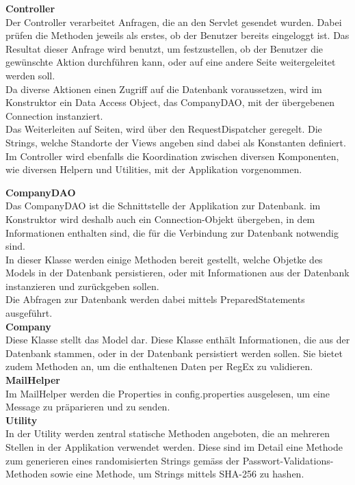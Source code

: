\documentclass[12pt]{scrartcl}
\begin{document}
\textbf{Controller}\\
Der Controller verarbeitet Anfragen, die an den Servlet gesendet wurden. Dabei prüfen die Methoden jeweils als erstes, ob der Benutzer bereits eingeloggt ist. Das Resultat dieser Anfrage wird benutzt, um festzustellen, ob der Benutzer die gewünschte Aktion durchführen kann, oder auf eine andere Seite weitergeleitet werden soll.\\
Da diverse Aktionen einen Zugriff auf die Datenbank voraussetzen, wird im Konstruktor ein Data Access Object, das CompanyDAO, mit der übergebenen Connection instanziert.\\
Das Weiterleiten auf Seiten, wird über den RequestDispatcher geregelt. Die Strings, welche Standorte der Views angeben sind dabei als Konstanten definiert.\\
Im Controller wird ebenfalls die Koordination zwischen diversen Komponenten, wie diversen Helpern und Utilities, mit der Applikation vorgenommen.

\textbf{CompanyDAO}\\
Das CompanyDAO ist die Schnittstelle der Applikation zur Datenbank. im Konstruktor wird deshalb auch ein Connection-Objekt übergeben, in dem Informationen enthalten sind, die für die Verbindung zur Datenbank notwendig sind.\\
In dieser Klasse werden einige Methoden bereit gestellt, welche Objetke des Models in der Datenbank persistieren, oder mit Informationen aus der Datenbank instanzieren und zurückgeben sollen.\\
Die Abfragen zur Datenbank werden dabei mittels PreparedStatements ausgeführt.\\

\textbf{Company}\\
Diese Klasse stellt das Model dar. Diese Klasse enthält Informationen, die aus der Datenbank stammen, oder in der Datenbank persistiert werden sollen. Sie bietet zudem Methoden an, um die enthaltenen Daten per RegEx zu validieren.\\

\textbf{MailHelper}\\
Im MailHelper werden die Properties in config.properties ausgelesen, um eine Message zu präparieren und zu senden.\\

\textbf{Utility}\\
In der Utility werden zentral statische Methoden angeboten, die an mehreren Stellen in der Applikation verwendet werden. Diese sind im Detail eine Methode zum generieren eines randomisierten Strings gemäss der Passwort-Validations-Methoden sowie eine Methode, um Strings mittels SHA-256 zu hashen.\\
\end{document}
